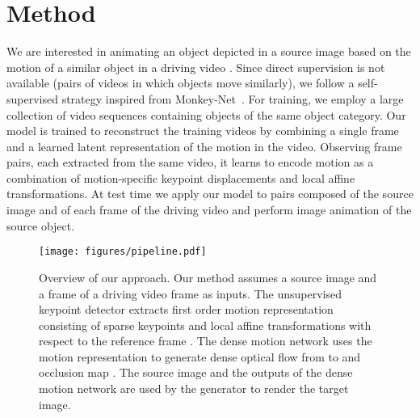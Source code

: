 \documentclass{article}
\begin{document}
\section{Method}
\vspace{-0.2cm}

\label{sec:overview}
We are interested in animating an object depicted in a source image  based on the motion of a similar object in a driving video . Since direct supervision is not available (pairs of videos in which objects move similarly), we follow a self-supervised strategy inspired from Monkey-Net~\cite{siarohin2018animating}. For training, we employ a large collection of video sequences containing objects of the same object category. Our model is trained to reconstruct the training videos by combining a single frame and a learned latent representation of the motion in the video. Observing frame pairs, each extracted from the same video, it learns to encode motion as a combination of motion-specific keypoint displacements and local affine transformations. At test time we apply our model to pairs composed of the source image and of each frame of the driving video and perform image animation of the source object. 



\begin{figure*}[t]\centering
\texttt{[image: figures/pipeline.pdf]}
\caption{Overview of our approach. Our method assumes a source image  and a frame of a driving video frame  as inputs. The unsupervised keypoint detector extracts first order motion representation consisting of sparse keypoints and local affine transformations with respect to the reference frame . The dense motion network uses the motion representation to generate dense optical flow  from  to  and occlusion map . The source image and the outputs of the dense motion network are used by the generator to render the target image.}
\label{fig:pipeline}
\vspace{-0.5cm}
\end{figure*}
\end{document}
